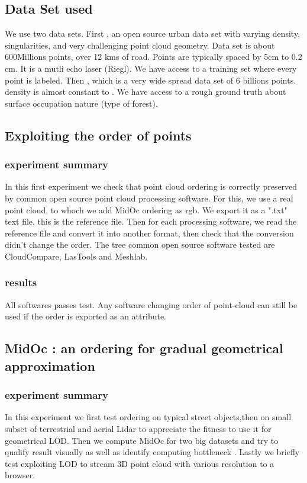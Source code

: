 	\subsection{Data Set used}
		We use two data sets.
		First , an open source urban data set with varying density, singularities, and very challenging point cloud geometry.
		Data set is about 600Millions points, over 12 kms of road. Points are typically spaced by 5cm to 0.2 cm. It is a mutli echo laser (Riegl).
		We have access to a training set where every point is labeled. 
		Then , which is a very wide spread data set of 6 billions points. density is almost constant to .
		We have access to a rough ground truth about surface occupation nature (type of forest).
		
	\subsection{Exploiting the order of points}
		\subsubsection{experiment summary}
			In this first experiment we check that point cloud ordering is correctly preserved by common open source point cloud processing software.
			For this, we use a real point cloud, to whoch we add MidOc ordering as rgb. 
			We export it as a ".txt" text file, this is the reference file.
			Then for each processing software, we read the reference file and convert it into another format, then check that the conversion didn't change the order. 
			The tree common open source software tested are CloudCompare, LasTools and Meshlab.
		\subsubsection{results}  
			All softwares passes test.
			Any software changing order of point-cloud can still be used if the order is exported as an attribute.
	\subsection{MidOc : an ordering for gradual geometrical approximation}
		\subsubsection{experiment summary}
			In this experiment we first test ordering on typical street objects,then on small subset of terrestrial and aerial Lidar to appreciate the fitness to use it for geometrical LOD.
			Then we compute MidOc for two big datasets and try to qualify result visually as well as identify computing bottleneck .
			Lastly we briefly test exploiting LOD to stream 3D point cloud with various resolution to a browser.
		
